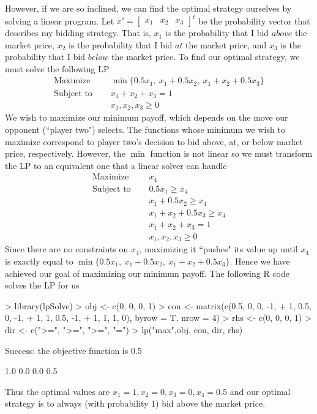 \documentclass[11pt, oneside]{article}     %
\begin{document}
However, if we are so inclined, we can find the optimal strategy ourselves
by solving a linear program. Let $x' = \begin{bmatrix}x_1 & x_2 & x_3\end{bmatrix}^t$ 
be the probability vector that describes my bidding strategy. 
That is, $x_1$ is  the probability that I bid $above$ the market price, $x_2$ 
is the probability that I bid $at$ the market price, and $x_3$ is the 
probability that I bid $below$ the market price. To find our optimal 
strategy, we must solve the following LP
\begin{align*}
\text{Maximize~~~~}&\min\{0.5x_1,~x_1 +0.5x_2,~x_1 + x_2+0.5x_3\}\\
\text{Subject to~~~~}&x_1 + x_2 + x_3 = 1\\
&x_1, x_2, x_3 \ge 0
\end{align*}
We wish to maximize our minimum payoff, which depends on the move
our opponent (``player two") selects. The functions whose minimum we wish
to maximize correspond to 
player two's decision to bid above, at, or below market price, respectively.
However, the $\min$ function is not linear so we must transform the LP 
to an equivalent one that a linear solver can handle
\begin{align*}
\text{Maximize~~~~}&x_4\\
\text{Subject to~~~~}&0.5x_1 \ge x_4 \\
&x_1 +0.5x_2 \ge x_4\\
&x_1 + x_2+0.5x_3 \ge x_4\\
&x_1 + x_2 + x_3 = 1\\
&x_1, x_2, x_3 \ge 0
\end{align*}
Since there are no constraints on $x_4$, maximizing it ``pushes" its value
up until $x_4$ is exactly equal to 
$\min\{0.5x_1,~x_1 +0.5x_2,~x_1 + x_2+0.5x_3\}$. Hence we have achieved our goal
of maximizing our minimum payoff.
The following R code solves the LP for us
\begin{Schunk}
\begin{Sinput}
> library(lpSolve)
> obj <- c(0, 0, 0, 1)
> con <- matrix(c(0.5, 0, 0, -1,
+                 1, 0.5, 0, -1,
+                 1, 1, 0.5, -1,
+                 1, 1, 1, 0), byrow = T, nrow = 4)
> rhs <- c(0, 0, 0, 1)
> dir <- c(">=", ">=", ">=", "=")
> lp("max",obj, con, dir, rhs)
\end{Sinput}
\begin{Soutput}
Success: the objective function is 0.5 
\end{Soutput}
\begin{Soutput}
[1] 1.0 0.0 0.0 0.5
\end{Soutput}
\end{Schunk}
Thus the optimal values are $x_1 = 1, x_2 = 0, x_3 = 0, 
x_4 = 0.5$ and our optimal strategy is to always (with probability 1) bid 
above the market price.
\end{document}
